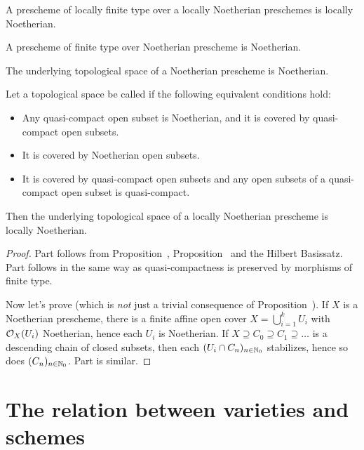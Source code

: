 \documentclass[a4paper,parskip=half,numbers=enddot, DIV=12]{scrreprt}
\begin{document}
\begin{fact}
    \begin{alphanumerate}
    \item 
        A prescheme of locally finite type over a locally Noetherian preschemes is locally Noetherian.
    \item   
        A prescheme of finite type over Noetherian prescheme is Noetherian.
    \item 
        The underlying topological space of a Noetherian prescheme is Noetherian.
    \item 
        Let a topological space be called  if the following equivalent conditions hold:
        \begin{itemize}
        \item[\itememph{\alpha}]
            Any quasi-compact open subset is Noetherian, and it is covered by quasi-compact open subsets.
        \item[\itememph{\beta}]
            It is covered by Noetherian open subsets.
        \item[\itememph{\gamma}] 
            It is covered by quasi-compact open subsets and any open subsets of a quasi-compact open subset is quasi-compact.
        \end{itemize}
        Then the underlying topological space of a locally Noetherian prescheme is locally Noetherian.
    \end{alphanumerate}
\end{fact}
\begin{proof}
	Part  follows from Proposition~, Proposition~ and the Hilbert Basissatz. Part  follows in the same way as quasi-compactness is preserved by morphisms of finite type.
	
	Now let's prove  (which is \emph{not} just a trivial consequence of Proposition~). If $X$ is a Noetherian prescheme, there is a finite affine open cover $X=\bigcup_{i=1}^kU_i$ with $\mathcal{O}_X(U_i)$ Noetherian, hence each $U_i$ is Noetherian. If $X\supseteq C_0\supseteq C_1\supseteq \ldots$ is a descending chain of closed subsets, then each $(U_i\cap C_n)_{n\in\mathbb{N}_0}$ stabilizes, hence so does $(C_n)_{n\in\mathbb{N}_0}$. Part  is similar.
\end{proof}

\section{The relation between varieties and schemes}
\end{document}
